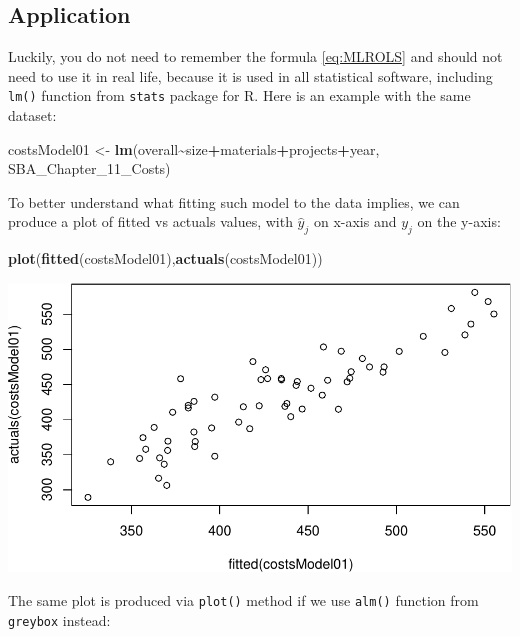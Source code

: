 \documentclass[
]{book}
\newenvironment{Shaded}{\begin{snugshade}}{\end{snugshade}}
\newcommand{\FunctionTok}[1]{\textcolor[rgb]{0.13,0.29,0.53}{\textbf{#1}}}
\newcommand{\NormalTok}[1]{#1}
\newcommand{\OtherTok}[1]{\textcolor[rgb]{0.56,0.35,0.01}{#1}}
\newcommand{\SpecialCharTok}[1]{\textcolor[rgb]{0.81,0.36,0.00}{\textbf{#1}}}
\theoremstyle{definition}
\theoremstyle{definition}
\theoremstyle{definition}
\theoremstyle{definition}
\theoremstyle{remark}
\begin{document}
\subsection{Application}\label{application}

Luckily, you do not need to remember the formula \eqref{eq:MLROLS} and should not need to use it in real life, because it is used in all statistical software, including \texttt{lm()} function from \texttt{stats} package for R. Here is an example with the same dataset:

\begin{Shaded}
\begin{Highlighting}[]
\NormalTok{costsModel01 }\OtherTok{\textless{}{-}} \FunctionTok{lm}\NormalTok{(overall}\SpecialCharTok{\textasciitilde{}}\NormalTok{size}\SpecialCharTok{+}\NormalTok{materials}\SpecialCharTok{+}\NormalTok{projects}\SpecialCharTok{+}\NormalTok{year, SBA\_Chapter\_11\_Costs)}
\end{Highlighting}
\end{Shaded}

To better understand what fitting such model to the data implies, we can produce a plot of fitted vs actuals values, with \(\hat{y}_j\) on x-axis and \(y_j\) on the y-axis:

\begin{Shaded}
\begin{Highlighting}[]
\FunctionTok{plot}\NormalTok{(}\FunctionTok{fitted}\NormalTok{(costsModel01),}\FunctionTok{actuals}\NormalTok{(costsModel01))}
\end{Highlighting}
\end{Shaded}

\includegraphics{Svetunkov---Statistics-for-Business-Analytics_files/figure-latex/unnamed-chunk-71-1.pdf}

The same plot is produced via \texttt{plot()} method if we use \texttt{alm()} function from \texttt{greybox} instead:
\end{document}
